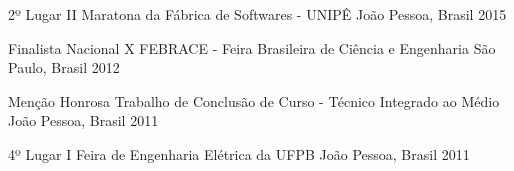 \begin{cvhonors}
  \cvhonor
    {2º Lugar} %
    {II Maratona da Fábrica de Softwares - UNIPÊ} %
    {João Pessoa, Brasil} %
    {2015} %
  
  \cvhonor
    {Finalista Nacional} %
    {X FEBRACE - Feira Brasileira de Ciência e Engenharia} %
    {São Paulo, Brasil} %
    {2012} %
  
  \cvhonor
    {Menção Honrosa} %
    {Trabalho de Conclusão de Curso - Técnico Integrado ao Médio} %
    {João Pessoa, Brasil} %
    {2011} %
  
  \cvhonor
    {4º Lugar} %
    {I Feira de Engenharia Elétrica da UFPB} %
    {João Pessoa, Brasil} %
    {2011} %
\end{cvhonors}
